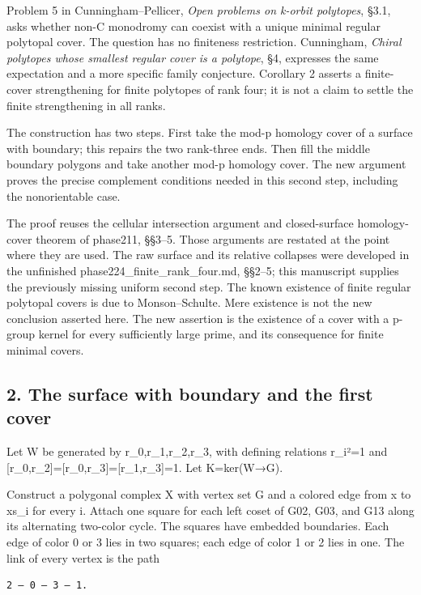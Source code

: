 \documentclass[
  11pt,
  a4paper,
]{article}
\begin{document}
Problem 5 in Cunningham--Pellicer, \emph{Open problems on k-orbit
polytopes}, §3.1, asks whether non-C monodromy can coexist with a unique
minimal regular polytopal cover. The question has no finiteness
restriction. Cunningham, \emph{Chiral polytopes whose smallest regular
cover is a polytope}, §4, expresses the same expectation and a more
specific family conjecture. Corollary 2 asserts a finite-cover
strengthening for finite polytopes of rank four; it is not a claim to
settle the finite strengthening in all ranks.

The construction has two steps. First take the mod-p homology cover of a
surface with boundary; this repairs the two rank-three ends. Then fill
the middle boundary polygons and take another mod-p homology cover. The
new argument proves the precise complement conditions needed in this
second step, including the nonorientable case.

The proof reuses the cellular intersection argument and closed-surface
homology-cover theorem of phase211, §§3--5. Those arguments are restated
at the point where they are used. The raw surface and its relative
collapses were developed in the unfinished
phase224\_finite\_rank\_four.md, §§2--5; this manuscript supplies the
previously missing uniform second step. The known existence of finite
regular polytopal covers is due to Monson--Schulte. Mere existence is
not the new conclusion asserted here. The new assertion is the existence
of a cover with a p-group kernel for every sufficiently large prime, and
its consequence for finite minimal covers.

\subsection{2. The surface with boundary and the first
cover}\label{the-surface-with-boundary-and-the-first-cover}

Let W be generated by r\_0,r\_1,r\_2,r\_3, with defining relations
r\_i²=1 and {[}r\_0,r\_2{]}={[}r\_0,r\_3{]}={[}r\_1,r\_3{]}=1. Let
K=ker(W→G).

Construct a polygonal complex X with vertex set G and a colored edge
from x to xs\_i for every i. Attach one square for each left coset of
G02, G03, and G13 along its alternating two-color cycle. The squares
have embedded boundaries. Each edge of color 0 or 3 lies in two squares;
each edge of color 1 or 2 lies in one. The link of every vertex is the
path

\begin{verbatim}
2 — 0 — 3 — 1.
\end{verbatim}
\end{document}
